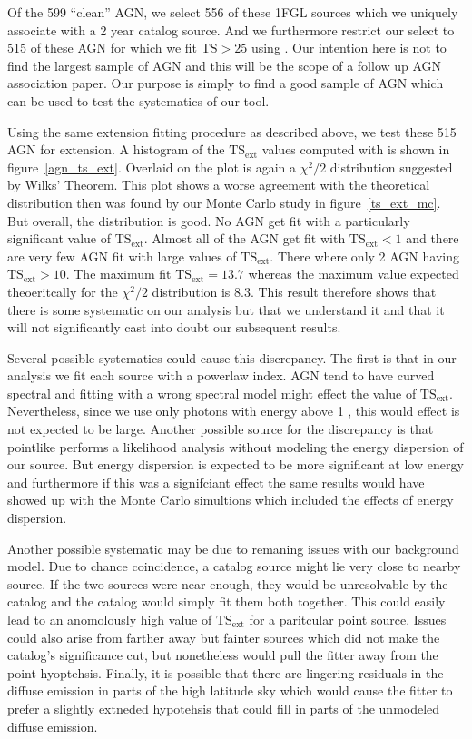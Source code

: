 \documentclass[12pt,preprint]{aastex}
\newcommand{\gev}{\text{GeV}\xspace}
\newcommand{\tsext}{{\ensuremath{\text{TS}_\text{ext}}}\xspace}
\newcommand{\ts}{\text{TS}\xspace}
\newcommand{\pointlike}{\text{\em pointlike}\xspace}
\begin{document}
Of the 599 ``clean'' AGN, we select 556 of these 1FGL sources which
we uniquely associate with a 2 year catalog source. And we furthermore
restrict our select to 515 of these AGN for which we fit $\ts>25$ using
\pointlike.  Our intention here is not to find the largest sample of
AGN and this will be the scope of a follow up AGN association paper. Our
purpose is simply to find a good sample of AGN which can be used to
test the systematics of our tool.

Using the same extension fitting procedure as described above, we
test these 515 AGN for extension. A histogram of the \tsext values
computed with \pointlike
is shown in figure~\ref{agn_ts_ext}. Overlaid on the plot is again a
$\chi^2/2$ distribution suggested by Wilks' Theorem.  This plot shows
a worse agreement with the theoretical distribution then was found
by our Monte Carlo study in figure~\ref{ts_ext_mc}.  But overall, the
distribution is good. No AGN get fit with a particularly significant
value of $\tsext$. Almost all of the AGN get fit with $\tsext<1$ and
there are very few AGN fit with large values of \tsext.  There where
only 2 AGN having $\tsext>10$.  The maximum fit $\tsext=13.7$ whereas the
maximum value expected theoeritcally for the $\chi^2/2$ distribution is
8.3. This result therefore shows that there is some systematic on our
analysis but that we understand it and that it will not significantly
cast into doubt our subsequent results.

Several possible systematics could cause this discrepancy. The first
is that in our analysis we fit each source with a powerlaw index.
AGN tend to have curved spectral and fitting with a wrong spectral
model might effect the value of \tsext. Nevertheless, since we use only
photons with energy above 1 \gev, this would effect is not expected to be large.
Another possible source for the discrepancy is that pointlike performs a
likelihood analysis without modeling the energy dispersion of our source.
But energy dispersion is expected to be more significant at low
energy and furthermore if this was a signifciant effect the same results
would have showed up with the Monte Carlo simultions which included the
effects of energy dispersion. 

Another possible systematic may be due to remaning issues with our
background model. Due to chance coincidence, a catalog source might
lie very close to nearby source. If the two sources were near enough,
they would be unresolvable by the catalog and the catalog would simply
fit them both together.  This could easily lead to an anomolously high
value of \tsext for a paritcular point source. Issues could also arise
from farther away but fainter sources which did not make the catalog's
significance cut, but nonetheless would pull the fitter away from the
point hyoptehsis.  Finally, it is possible that there are lingering
residuals in the diffuse emission in parts of the high latitude sky
which would cause the fitter to prefer a slightly extneded hypotehsis
that could fill in parts of the unmodeled diffuse emission.
\end{document}
